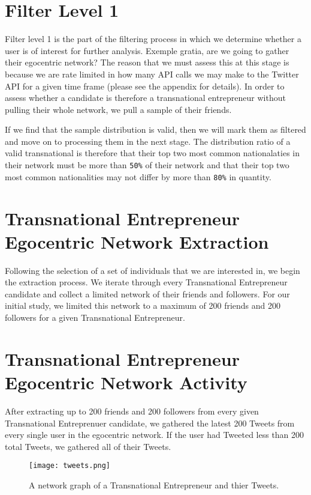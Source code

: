 \section{Filter Level 1}
Filter level 1 is the part of the filtering process in which we
determine whether a user is of interest for further analysis. Exemple
gratia, are we going to gather their egocentric network? The reason
that we must assess this at this stage is because we are rate limited
in how many API calls we may make to the Twitter API for a given time
frame (please see the appendix for details). In order to assess
whether a candidate is therefore a transnational entrepreneur without
pulling their whole network, we pull a sample of their friends.

If we find that the sample distribution is valid, then we will mark
them as filtered and move on to processing them in the next stage. The
distribution ratio of a valid transnational is therefore that their
top two most common nationalaties in their network must be more than
\verb|50%| of their network and that their top two most common
nationalities may not differ by more than \verb|80%| in quantity.

\section{Transnational Entrepreneur Egocentric Network Extraction}
Following the selection of a set of individuals that we are interested
in, we begin the extraction process. We iterate through every
Transnational Entrepreneur candidate and collect a limited network of
their friends and followers. For our initial study, we limited this
network to a maximum of 200 friends and 200 followers for a given
Transnational Entrepreneur.

\section{Transnational Entrepreneur Egocentric Network Activity}
After extracting up to 200 friends and 200 followers from every given
Transnational Entreprenuer candidate, we gathered the latest 200
Tweets from every single user in the egocentric network. If the user
had Tweeted less than 200 total Tweets, we gathered all of their
Tweets.

\begin{figure}[H]
  \centering
  \texttt{[image: tweets.png]}
  \caption{A network graph of a Transnational Entrepreneur and thier Tweets.}
\end{figure}


